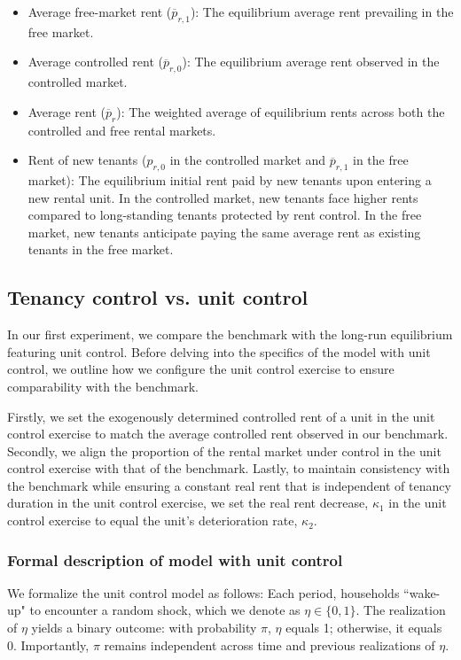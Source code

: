 \documentclass[parskip=full]{article}
\begin{document}
\begin{itemize}
    \item Average free-market rent ($\overline{p}_{r,1}$): The equilibrium average rent prevailing in the free market.
    \item Average controlled rent ($\overline{p}_{r,0}$): The equilibrium average rent observed in the controlled market.
    \item Average rent ($\overline{p}_{r}$): The weighted average of equilibrium rents across both the controlled and free rental markets.
    \item Rent of new tenants ($p_{r,0}$ in the controlled market and $\overline{p}_{r,1}$ in the free market): The equilibrium initial rent paid by new tenants upon entering a new rental unit. In the controlled market, new tenants face higher rents compared to long-standing tenants protected by rent control. In the free market, new tenants anticipate paying the same average rent as existing tenants in the free market.
\end{itemize}

\subsection{Tenancy control vs. unit control}

In our first experiment, we compare the benchmark with the long-run equilibrium featuring unit control. Before delving into the specifics of the model with unit control, we outline how we configure the unit control exercise to ensure comparability with the benchmark.

Firstly, we set the exogenously determined controlled rent of a unit in the unit control exercise to match the average controlled rent observed in our benchmark. Secondly, we align the proportion of the rental market under control in the unit control exercise with that of the benchmark. Lastly, to maintain consistency with the benchmark while ensuring a constant real rent that is independent of tenancy duration in the unit control exercise, we set the real rent decrease, $\kappa_{1}$ in the unit control exercise to equal the unit's deterioration rate, $\kappa_{2}$.

\subsubsection{Formal description of model with unit control}

We formalize the unit control model as follows: Each period, households ``wake-up" to encounter a random shock, which we denote as $\eta \in \{0,1\}$. The realization of $\eta$ yields a binary outcome: with probability $\pi$, $\eta$ equals 1; otherwise, it equals 0. Importantly, $\pi$ remains independent across time and previous realizations of $\eta$.
\end{document}
